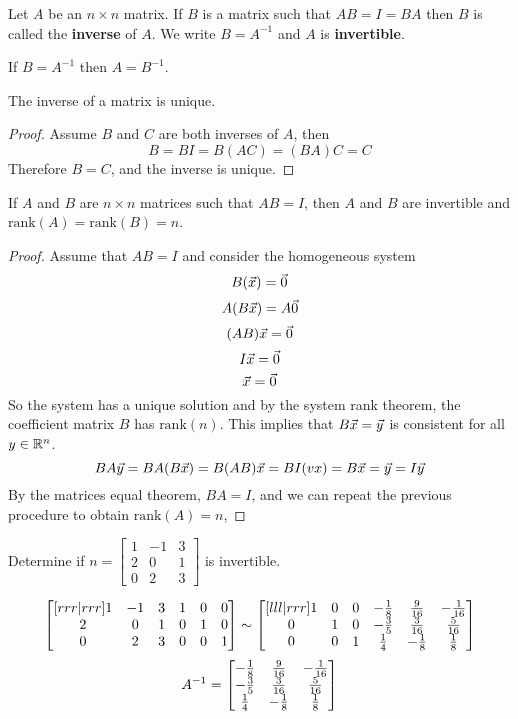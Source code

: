 \documentclass[english, 12pt]{article}
\begin{document}
\begin{defn}
Let $A$ be an $n \times n$ matrix. If $B$ is a matrix such that $AB = I = BA$ then $B$ is called the \textbf{inverse} of $A$. We write $B = A^{-1}$ and $A$ is \textbf{invertible}.
\end{defn}

\begin{note}
If $B = A^{-1}$ then $A = B^{-1}$.
\end{note}

\begin{thrm}
The inverse of a matrix is unique.
\begin{proof}
Assume $B$ and $C$ are both inverses of $A$, then
\[B = BI = B(AC) = (BA)C = C\]
Therefore $B = C$, and the inverse is unique.
\end{proof}
\end{thrm}

\begin{thrm}
If $A$ and $B$ are $n \times n$ matrices such that $AB = I$, then $A$ and $B$ are invertible and $\text{rank}(A) = \text{rank}(B) = n$.
\begin{proof}
Assume that $AB=I$ and consider the homogeneous system
\[B(\vec{x}) = \vec{0}\]
\[A(B\vec{x}) = A\vec{0}\]
\[(AB)\vec{x} = \vec{0}\]
\[I\vec{x} = \vec{0}\]
\[\vec{x} = \vec{0}\]
So the system has a unique solution and by the system rank theorem, the coefficient matrix $B$ has $\text{rank}(n)$. This implies that $B\vec{x} = \vec{y}$ is consistent for all $y \in {\mathbb{R}}^n$.
\[BA\vec{y} = BA(B\vec{x}) = B(AB)\vec{x} = BI(vx) = B\vec{x} = \vec{y} = I\vec{y}\]
By the matrices equal theorem, $BA = I$, and we can repeat the previous procedure to obtain $\text{rank}(A) = n$,
\end{proof}
\end{thrm}

\begin{exmp}
Determine if $n = \begin{bmatrix} 1 & -1 & 3 \\ 2 & 0 & 1 \\ 0 & 2 & 3 \end{bmatrix}$ is invertible.
\begin{sol}
\[\begin{bmatrix}[rrr|rrr] 1 & -1 & 3 & 1 & 0 & 0\\ 2 & 0 & 1 & 0 & 1 & 0\\ 0 & 2 & 3 & 0 & 0 & 1\end{bmatrix} \sim \begin{bmatrix}[lll|rrr] 1 & 0 & 0 & -\frac{1}{8} & \frac{9}{16} & -\frac{1}{16} \\ 0 & 1 & 0 & -\frac{3}{5} & \frac{3}{16} & \frac{5}{16} \\ 0 & 0 & 1 & \frac{1}{4} & - \frac{1}{8} & \frac{1}{8}\end{bmatrix}\]
\[A^{-1} = \begin{bmatrix} -\frac{1}{8} & \frac{9}{16} & -\frac{1}{16} \\ -\frac{3}{5} & \frac{3}{16} & \frac{5}{16} \\ \frac{1}{4} & - \frac{1}{8} & \frac{1}{8}\end{bmatrix}\]
\end{sol}
\end{exmp}
\end{document}
